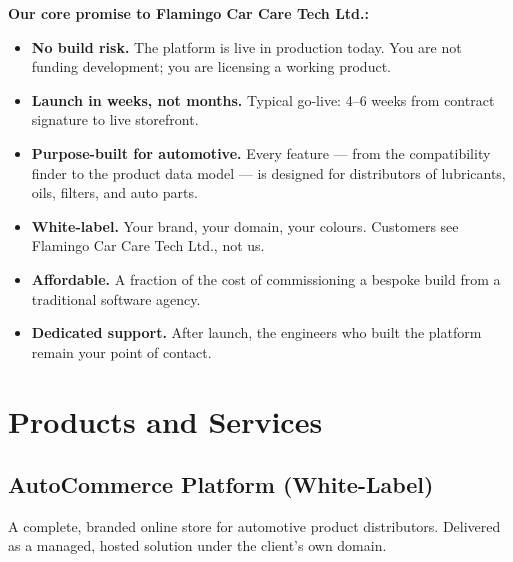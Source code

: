 \documentclass[11pt,a4paper]{article}
\begin{document}
\medskip
\noindent\textbf{Our core promise to Flamingo Car Care Tech Ltd.:}
\begin{itemize}[leftmargin=1.4em,itemsep=3pt]
  \item \textbf{No build risk.} The platform is live in production today.
        You are not funding development; you are licensing a
        working product.
  \item \textbf{Launch in weeks, not months.} Typical go-live:
        4--6 weeks from contract signature to live storefront.
  \item \textbf{Purpose-built for automotive.} Every feature --- from the
        compatibility finder to the product data model --- is designed
        for distributors of lubricants, oils, filters, and auto parts.
  \item \textbf{White-label.} Your brand, your domain, your colours.
        Customers see Flamingo Car Care Tech Ltd., not us.
  \item \textbf{Affordable.} A fraction of the cost of commissioning a
        bespoke build from a traditional software agency.
  \item \textbf{Dedicated support.} After launch, the engineers who built
        the platform remain your point of contact.
\end{itemize}

\section{Products and Services}

\subsection{AutoCommerce Platform (White-Label)}

A complete, branded online store for automotive product distributors.
Delivered as a managed, hosted solution under the client's own domain.
\end{document}
